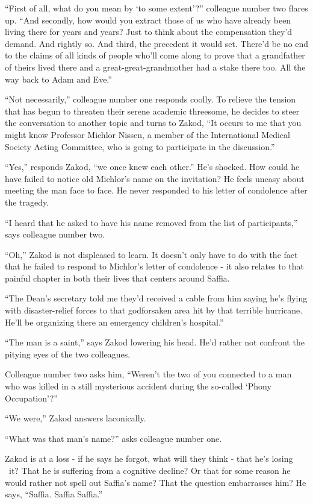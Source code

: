 \documentclass[twoside,11pt]{book}
\begin{document}
``First of all, what do you mean by {`to some extent'}?'' colleague number two flares up.
``And secondly, how would you extract those of us who have already been living there for years and
years? Just to think about the compensation they'd demand. And rightly so. And third, the precedent it would set.
There'd be no end to the claims of all kinds of people who'll come along to prove that a grandfather of theirs lived
there and a great-great-grandmother had a stake there too. All the way back to Adam and Eve.''

``Not necessarily,'' colleague number one responds coolly. To relieve the tension that has
begun to threaten their serene academic threesome, he decides to steer the conversation to another topic and turns to
Zakod, ``It occurs to me that you might know Professor Michlor Nissen, a member of the International
Medical Society Acting Committee, who is going to participate in the discussion.''

``Yes,'' responds Zakod, ``we once knew each other.'' He's shocked.
How could he have failed to notice old Michlor's name on the invitation?  He feels uneasy about meeting the man face
to face. He never responded to his letter of condolence after the tragedy.

``I heard that he asked to have his name removed from the list of participants,'' says
colleague number two.

``Oh,'' Zakod is not displeased to learn. It doesn't only have to do with the fact that he
failed to respond to Michlor's letter of condolence - it also relates to that painful chapter in both their lives that
centers around Saffia.

``The Dean's secretary told me they'd received a cable from him saying he's flying with disaster-relief
forces to that godforsaken area hit by that terrible hurricane. He'll be organizing there an
emergency children's hospital.''

``The man is a saint,'' says Zakod lowering his head. He'd rather not confront the pitying eyes
of the two colleagues.

Colleague number two asks him, ``Weren't the two of you connected to a man who was killed in a still
mysterious accident during the so-called `Phony Occupation'?''

``We were,'' Zakod answers laconically.

``What was that man's name?'' asks colleague number one.

Zakod is at a loss - if he says he forgot, what will they think - that he's losing
\ it? That he is suffering from a cognitive decline? Or that for some reason he would
rather not spell out Saffia's name? That the question embarrasses him? He says, ``Saffia. Saffia
Saffia.''
\end{document}
